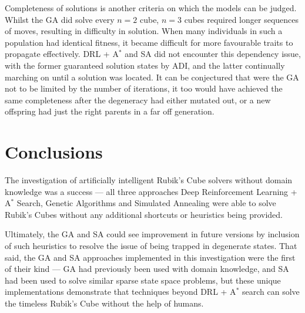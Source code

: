 \documentclass[UKenglish]{svproc}
\begin{document}
Completeness of solutions is another criteria on which the models can be judged. Whilst the GA did solve every $n=2$ cube, $n=3$ cubes required longer sequences of moves, resulting in difficulty in solution. When many individuals in such a population had identical fitness, it became difficult for more favourable traits to propagate effectively. DRL + A$^{\ast}$ and SA did not encounter this dependency issue, with the former guaranteed solution states by ADI, and the latter continually marching on until a solution was located. It can be conjectured that were the GA not to be limited by the number of iterations, it too would have achieved the same completeness after the degeneracy had either mutated out, or a new offspring had just the right parents in a far off generation.

\section{Conclusions}
The investigation of artificially intelligent Rubik's Cube solvers without domain knowledge was a success --- all three approaches Deep Reinforcement Learning + A$^{\ast}$ Search, Genetic Algorithms and Simulated Annealing were able to solve Rubik's Cubes without any additional shortcuts or heuristics being provided.

Ultimately, the GA and SA could see improvement in future versions by inclusion of such heuristics to resolve the issue of being trapped in degenerate states. That said, the GA and SA approaches implemented in this investigation were the first of their kind --- GA had previously been used with domain knowledge, and SA had been used to solve similar sparse state space problems, but these unique implementations demonstrate that techniques beyond DRL + A$^{\ast}$ search can solve the timeless Rubik's Cube without the help of humans.

\printbibliography
\end{document}
